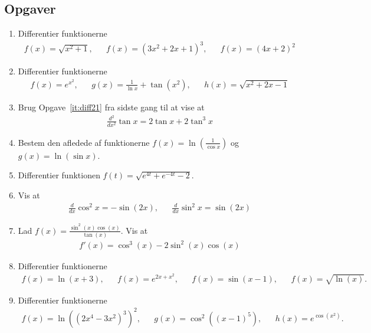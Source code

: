 \subsection{Opgaver}

\begin{enumerate}
			
	\item Differentier funktionerne
	\begin{align*}
	f(x)=\sqrt{x^2+1},&&f(x)=(3x^2+2x+1)^3,&&f(x)=(4x+2)^2
	\end{align*}
	
	\item Differentier funktionerne
	\begin{align*}
	f(x)=e^{x^2},&& g(x)=\frac{1}{\ln x}+\tan(x^2),&&h(x)=\sqrt{x^2+2x-1}
	\end{align*}
	
	\item Brug Opgave~\ref{it:diff21} fra sidste gang til at vise at 
	\begin{align*}
	\frac{d^2}{dx^2}\tan x =2\tan x+2\tan^3x
	\end{align*}
	
	\item Bestem den afledede af funktionerne $f(x)=\ln(\frac{1}{\cos x})$ og $g(x)=\ln(\sin x)$.
	
	\item Differentier funktionen $ f(t)=\sqrt{e^{4t}+e^{-4t}-2} $.
	
	\item Vis at
	\begin{align*}
	\frac{d}{dx}\cos^2x=-\sin(2x),&& \frac{d}{dx}\sin^2x=\sin(2x)
	\end{align*}
	
	\item Lad $f(x)=\frac{\sin^2(x)\cos(x)}{\tan(x)}$. Vis at
	\begin{align*}
	f'(x)=\cos^3(x)-2\sin^2(x)\cos(x)
	\end{align*}
	
	\item Differentier funktionerne
	\begin{align*}
	f(x)=\ln(x+3),&& f(x)=e^{2x+x^2},&& f(x)=\sin(x-1),&&f(x)=\sqrt{\ln(x)}.
	\end{align*}
	

	
	\item Differentier funktionerne 
	\begin{align*}
	f(x)=\ln((2x^4-3x^2)^3)^2,&&g(x)=\cos^2((x-1)^5),&& h(x)=e^{\cos(x^2)}.
	\end{align*}
	

\end{enumerate}
